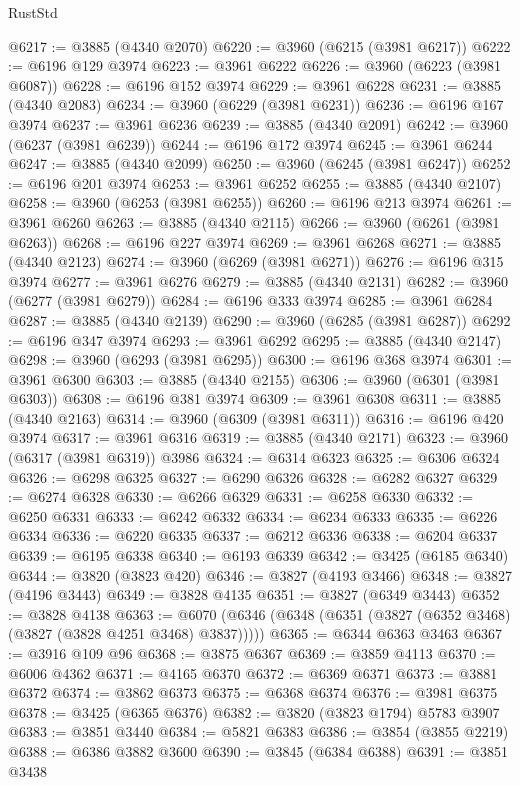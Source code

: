 \begin{lexlean}{RustStd}
\begin{coremodule}
@6217 := @3885 (@4340 @2070)
@6220 := @3960 (@6215 (@3981 @6217))
@6222 := @6196 @129 @3974
@6223 := @3961 @6222
@6226 := @3960 (@6223 (@3981 @6087))
@6228 := @6196 @152 @3974
@6229 := @3961 @6228
@6231 := @3885 (@4340 @2083)
@6234 := @3960 (@6229 (@3981 @6231))
@6236 := @6196 @167 @3974
@6237 := @3961 @6236
@6239 := @3885 (@4340 @2091)
@6242 := @3960 (@6237 (@3981 @6239))
@6244 := @6196 @172 @3974
@6245 := @3961 @6244
@6247 := @3885 (@4340 @2099)
@6250 := @3960 (@6245 (@3981 @6247))
@6252 := @6196 @201 @3974
@6253 := @3961 @6252
@6255 := @3885 (@4340 @2107)
@6258 := @3960 (@6253 (@3981 @6255))
@6260 := @6196 @213 @3974
@6261 := @3961 @6260
@6263 := @3885 (@4340 @2115)
@6266 := @3960 (@6261 (@3981 @6263))
@6268 := @6196 @227 @3974
@6269 := @3961 @6268
@6271 := @3885 (@4340 @2123)
@6274 := @3960 (@6269 (@3981 @6271))
@6276 := @6196 @315 @3974
@6277 := @3961 @6276
@6279 := @3885 (@4340 @2131)
@6282 := @3960 (@6277 (@3981 @6279))
@6284 := @6196 @333 @3974
@6285 := @3961 @6284
@6287 := @3885 (@4340 @2139)
@6290 := @3960 (@6285 (@3981 @6287))
@6292 := @6196 @347 @3974
@6293 := @3961 @6292
@6295 := @3885 (@4340 @2147)
@6298 := @3960 (@6293 (@3981 @6295))
@6300 := @6196 @368 @3974
@6301 := @3961 @6300
@6303 := @3885 (@4340 @2155)
@6306 := @3960 (@6301 (@3981 @6303))
@6308 := @6196 @381 @3974
@6309 := @3961 @6308
@6311 := @3885 (@4340 @2163)
@6314 := @3960 (@6309 (@3981 @6311))
@6316 := @6196 @420 @3974
@6317 := @3961 @6316
@6319 := @3885 (@4340 @2171)
@6323 := @3960 (@6317 (@3981 @6319)) @3986
@6324 := @6314 @6323
@6325 := @6306 @6324
@6326 := @6298 @6325
@6327 := @6290 @6326
@6328 := @6282 @6327
@6329 := @6274 @6328
@6330 := @6266 @6329
@6331 := @6258 @6330
@6332 := @6250 @6331
@6333 := @6242 @6332
@6334 := @6234 @6333
@6335 := @6226 @6334
@6336 := @6220 @6335
@6337 := @6212 @6336
@6338 := @6204 @6337
@6339 := @6195 @6338
@6340 := @6193 @6339
@6342 := @3425 (@6185 @6340)
@6344 := @3820 (@3823 @420)
@6346 := @3827 (@4193 @3466)
@6348 := @3827 (@4196 @3443)
@6349 := @3828 @4135
@6351 := @3827 (@6349 @3443)
@6352 := @3828 @4138
@6363 := @6070 (@6346 (@6348 (@6351 (@3827 (@6352 @3468) (@3827 (@3828 @4251 @3468) @3837)))))
@6365 := @6344 @6363 @3463
@6367 := @3916 @109 @96
@6368 := @3875 @6367
@6369 := @3859 @4113
@6370 := @6006 @4362
@6371 := @4165 @6370
@6372 := @6369 @6371
@6373 := @3881 @6372
@6374 := @3862 @6373
@6375 := @6368 @6374
@6376 := @3981 @6375
@6378 := @3425 (@6365 @6376)
@6382 := @3820 (@3823 @1794) @5783 @3907
@6383 := @3851 @3440
@6384 := @5821 @6383
@6386 := @3854 (@3855 @2219)
@6388 := @6386 @3882 @3600
@6390 := @3845 (@6384 @6388)
@6391 := @3851 @3438

\end{coremodule}
\end{lexlean}
